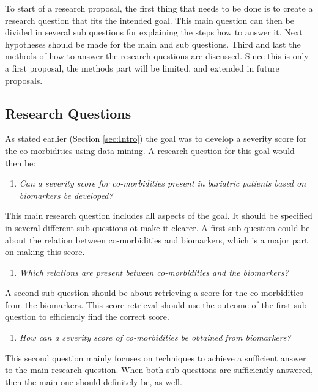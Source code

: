 \documentclass[10pt,a4paper]{article}
\begin{document}
	To start of a research proposal, the first thing that needs to be done is to create a research question that fits the intended goal. This main question can then be divided in several sub questions for explaining the steps how to answer it. Next hypotheses should be made for the main and sub questions. Third and last the methods of how to answer the research questions are discussed. Since this is only a first proposal, the methods part will be limited, and extended in future proposals.
	
	\subsection{Research Questions}
	
	As stated earlier (Section \ref{sec:Intro}) the goal was to develop a severity score for the co-morbidities using data mining. A research question for this goal would then be:
	
	\begin{enumerate}
		\item[] \emph{Can a severity score for co-morbidities present in bariatric patients based on biomarkers be developed?}
	\end{enumerate}
	
	This main research question includes all aspects of the goal. It should be specified in several different sub-questions ot make it clearer. A first sub-question could be about the relation between co-morbidities and biomarkers, which is a major part on making this score.
	
	\begin{enumerate}
		\item \emph{Which relations are present between co-morbidities and the biomarkers?}
	\end{enumerate}
	
	A second sub-question should be about retrieving a score for the co-morbidities from the biomarkers. This score retrieval should use the outcome of the first sub-question to efficiently find the correct score.
	
	\begin{enumerate}[resume]
		\item \emph{How can a severity score of co-morbidities be obtained from biomarkers?}
	\end{enumerate}
	
	This second question mainly focuses on techniques to achieve a sufficient answer to the main research question. When both sub-questions are sufficiently answered, then the main one should definitely be, as well.
	
\end{document}

